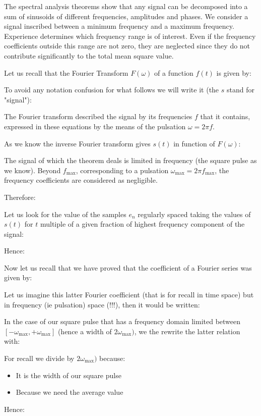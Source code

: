 	\begin{dem}
	The spectral analysis theorems show that any signal can be decomposed into a sum of sinusoids of different frequencies, amplitudes and phases. We consider a signal inscribed between a minimum frequency and a maximum frequency. Experience determines which frequency range is of interest. Even if the frequency coefficients outside this range are not zero, they are neglected since they do not contribute significantly to the total mean square value.
	
	Let us recall that the Fourier Transform $F(\omega)$ of a function $f(t)$ is given by:
	
	To avoid any notation confusion for what follows we will write it (the $s$ stand for "signal"):
	
	The Fourier transform described the signal by its frequencies $f$ that it contains, expressed in these equations by the means of the pulsation $\omega=2\pi f$.

	As we know the inverse Fourier transform gives $s(t)$ in function of $F(\omega)$:
	
	The signal of which the theorem deals is limited in frequency (the square pulse as we know). Beyond $f_{\mathrm{max}}$, corresponding to a pulsation $\omega_{\mathrm{max}}=2\pi f_{\mathrm{max}}$, the frequency coefficients are considered as negligible. 
	
	Therefore:
	
	Let us look for the value of the samples $e_n$ regularly spaced taking the values of $s(t)$ for $t$ multiple of a given fraction of highest frequency component of the signal:
	
	Hence:
	
	Now let us recall that we have proved that the coefficient of a Fourier series was given by:
	
	Let us imagine this latter Fourier coefficient (that is for recall in time space) but in frequency (ie pulsation) space (!!!), then it would be written:
	
	In the case of our square pulse that has a frequency domain limited between $[-\omega_\mathrm{max},+\omega_\mathrm{max}]$ (hence a width of $2\omega_\mathrm{max})$, we the rewrite the latter relation with:
	
	For recall we divide by $2\omega_\mathrm{max})$ because:
	\begin{itemize}
		\item It is the width of our square pulse
		\item Because we need the average value
	\end{itemize}
	Hence:
	

\end{dem}
